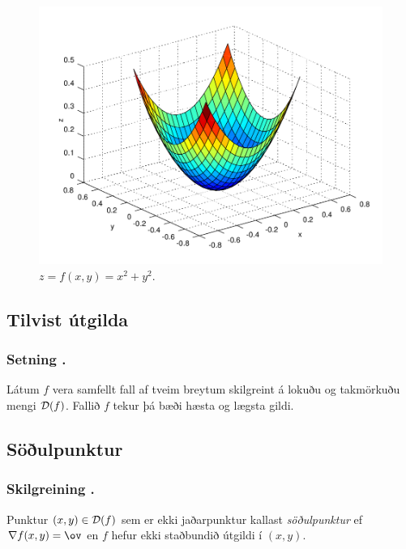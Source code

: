 \begin{figure}[!h]
\begin{minipage}{.5\textwidth}
            \includegraphics[width=.8\linewidth]{max_bound.png}
            \caption*{$z= f(x,y) = x^2+y^2$.}
        \end{minipage}
    \end{figure}





\subsection{Tilvist útgilda} 

\subsubsection{Setning \kaflanr.}
Látum $f$ vera samfellt fall af tveim breytum
skilgreint á lokuðu og takmörkuðu mengi ${\cal D}(f)$.  Fallið $f$
  tekur þá bæði hæsta og lægsta gildi. 






\subsection{Söðulpunktur} 

\subsubsection{Skilgreining \kaflanr.}
 Punktur $(x,y)\in  {\cal D}(f)$ sem er ekki
jaðarpunktur kallast {\em \color{red} söðulpunktur} ef $\nabla f(x,y)=\ov$ en $f$
hefur ekki staðbundið útgildi í $(x,y)$.




